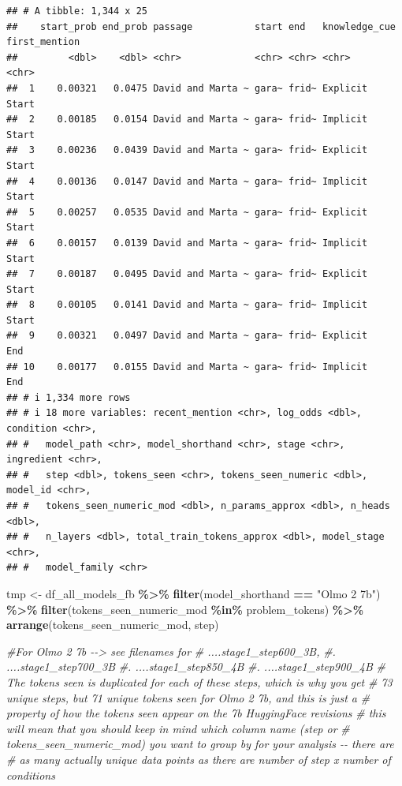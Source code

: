 \documentclass[
]{article}
\newenvironment{Shaded}{\begin{snugshade}}{\end{snugshade}}
\newcommand{\CommentTok}[1]{\textcolor[rgb]{0.56,0.35,0.01}{\textit{#1}}}
\newcommand{\FunctionTok}[1]{\textcolor[rgb]{0.13,0.29,0.53}{\textbf{#1}}}
\newcommand{\NormalTok}[1]{#1}
\newcommand{\OtherTok}[1]{\textcolor[rgb]{0.56,0.35,0.01}{#1}}
\newcommand{\SpecialCharTok}[1]{\textcolor[rgb]{0.81,0.36,0.00}{\textbf{#1}}}
\newcommand{\StringTok}[1]{\textcolor[rgb]{0.31,0.60,0.02}{#1}}
\begin{document}
\begin{verbatim}
## # A tibble: 1,344 x 25
##    start_prob end_prob passage           start end   knowledge_cue first_mention
##         <dbl>    <dbl> <chr>             <chr> <chr> <chr>         <chr>        
##  1    0.00321   0.0475 David and Marta ~ gara~ frid~ Explicit      Start        
##  2    0.00185   0.0154 David and Marta ~ gara~ frid~ Implicit      Start        
##  3    0.00236   0.0439 David and Marta ~ gara~ frid~ Explicit      Start        
##  4    0.00136   0.0147 David and Marta ~ gara~ frid~ Implicit      Start        
##  5    0.00257   0.0535 David and Marta ~ gara~ frid~ Explicit      Start        
##  6    0.00157   0.0139 David and Marta ~ gara~ frid~ Implicit      Start        
##  7    0.00187   0.0495 David and Marta ~ gara~ frid~ Explicit      Start        
##  8    0.00105   0.0141 David and Marta ~ gara~ frid~ Implicit      Start        
##  9    0.00321   0.0497 David and Marta ~ gara~ frid~ Explicit      End          
## 10    0.00177   0.0155 David and Marta ~ gara~ frid~ Implicit      End          
## # i 1,334 more rows
## # i 18 more variables: recent_mention <chr>, log_odds <dbl>, condition <chr>,
## #   model_path <chr>, model_shorthand <chr>, stage <chr>, ingredient <chr>,
## #   step <dbl>, tokens_seen <chr>, tokens_seen_numeric <dbl>, model_id <chr>,
## #   tokens_seen_numeric_mod <dbl>, n_params_approx <dbl>, n_heads <dbl>,
## #   n_layers <dbl>, total_train_tokens_approx <dbl>, model_stage <chr>,
## #   model_family <chr>
\end{verbatim}

\begin{Shaded}
\begin{Highlighting}[]
\NormalTok{tmp }\OtherTok{\textless{}{-}}\NormalTok{ df\_all\_models\_fb }\SpecialCharTok{\%\textgreater{}\%}
  \FunctionTok{filter}\NormalTok{(model\_shorthand }\SpecialCharTok{==} \StringTok{"Olmo 2 7b"}\NormalTok{) }\SpecialCharTok{\%\textgreater{}\%}
  \FunctionTok{filter}\NormalTok{(tokens\_seen\_numeric\_mod }\SpecialCharTok{\%in\%}\NormalTok{ problem\_tokens) }\SpecialCharTok{\%\textgreater{}\%} 
  \FunctionTok{arrange}\NormalTok{(tokens\_seen\_numeric\_mod, step)}

\CommentTok{\#For Olmo 2 7b {-}{-}\textgreater{} see filenames for }
\CommentTok{\#   ....stage1\_step600\_3B, }
\CommentTok{\#.  ....stage1\_step700\_3B}
\CommentTok{\#.  ....stage1\_step850\_4B}
\CommentTok{\#.  ....stage1\_step900\_4B}
\CommentTok{\# The tokens seen is duplicated for each of these steps, which is why you get }
\CommentTok{\# 73 unique steps, but 71 unique tokens seen for Olmo 2 7b, and this is just a }
\CommentTok{\# property of how the tokens seen appear on the 7b HuggingFace revisions}
\CommentTok{\# this will mean that you should keep in mind which column name (\textasciigrave{}step\textasciigrave{} or }
\CommentTok{\# \textasciigrave{}tokens\_seen\_numeric\_mod\textasciigrave{}) you want to group by for your analysis {-}{-} there are}
\CommentTok{\# as many actually unique data points as there are number of \textasciigrave{}step\textasciigrave{} x number of conditions}
\end{Highlighting}
\end{Shaded}
\end{document}
